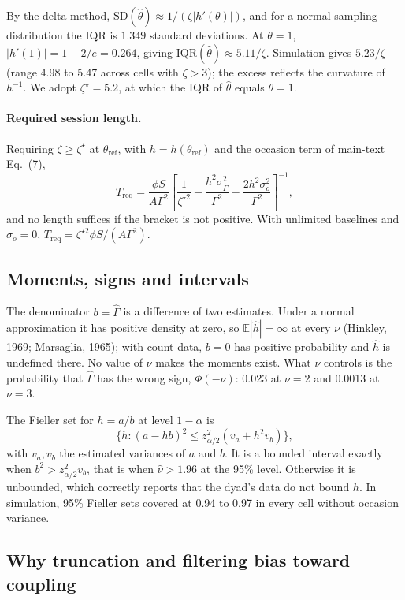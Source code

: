 \documentclass[12pt]{article}
\theoremstyle{definition}
\begin{document}
By the delta method, $\mathrm{SD}(\hat\theta)\approx1/(\zeta|h'(\theta)|)$, and for a
normal sampling distribution the IQR is $1.349$ standard deviations. At $\theta=1$,
$|h'(1)|=1-2/e=0.264$, giving $\mathrm{IQR}(\hat\theta)\approx5.11/\zeta$. Simulation
gives $5.23/\zeta$ (range 4.98 to 5.47 across cells with $\zeta>3$); the excess
reflects the curvature of $h^{-1}$. We adopt $\zeta^\star=5.2$, at which the IQR of
$\hat\theta$ equals $\theta=1$.

\paragraph{Required session length.} Requiring $\zeta\ge\zeta^\star$ at
$\theta_{\mathrm{ref}}$, with $h=h(\theta_{\mathrm{ref}})$ and the occasion term of
main-text Eq.~(7),
\begin{equation}\label{eq:Treq}
T_{\mathrm{req}}=\frac{\phi S}{A\Gamma^2}\left[\frac{1}{\zeta^{\star2}}
-\frac{h^2\sigma_{\hat\Gamma}^2}{\Gamma^2}-\frac{2h^2\sigma_o^2}{\Gamma^2}\right]^{-1},
\end{equation}
and no length suffices if the bracket is not positive. With unlimited baselines
and $\sigma_o=0$, $T_{\mathrm{req}}=\zeta^{\star2}\phi S/(A\Gamma^2)$.

\subsection{Moments, signs and intervals}

The denominator $b=\hat\Gamma$ is a difference of two estimates. Under a normal
approximation it has positive density at zero, so $\mathbb{E}|\hat h|=\infty$ at every
$\nu$ (Hinkley, 1969; Marsaglia, 1965); with count data, $b=0$ has positive probability and
$\hat h$ is undefined there. No value of $\nu$ makes the moments exist.
What $\nu$ controls is the probability that $\hat\Gamma$ has the wrong sign,
$\Phi(-\nu)$: 0.023 at $\nu=2$ and 0.0013 at $\nu=3$.

The Fieller set for $h=a/b$ at level $1-\alpha$ is
\[
\{h:(a-hb)^2\le z_{\alpha/2}^2(v_a+h^2v_b)\},
\]
with $v_a,v_b$ the estimated variances of $a$ and $b$. It is a bounded interval
exactly when $b^2>z_{\alpha/2}^2v_b$, that is when $\hat\nu>1.96$ at the 95\% level.
Otherwise it is unbounded, which correctly reports that the dyad's data do not
bound $h$. In simulation, 95\% Fieller sets covered at 0.94 to 0.97 in every cell
without occasion variance.

\subsection{Why truncation and filtering bias toward coupling}
\end{document}
